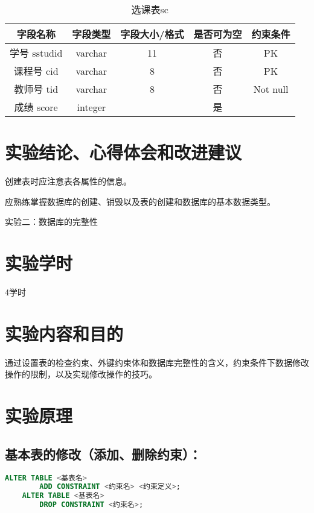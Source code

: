 \documentclass[a4paper]{uestcreport}
\begin{document}
\begin{table}[!h]
    \centering
    \caption{选课表sc}\label{tab:scTable}%
    \begin{tabular}{|c|c|c|c|c|}
        \hline
        字段名称     & 字段类型 & 字段大小/格式 & 是否可为空 & 约束条件 \\
        \hline
        学号 sstudid & varchar  & 11            & 否         & PK       \\
        \hline
        课程号 cid   & varchar  & 8             & 否         & PK       \\
        \hline
        教师号 tid   & varchar  & 8             & 否         & Not null \\
        \hline
        成绩 score   & integer  &               & 是         &          \\
        \hline
    \end{tabular}
\end{table}

\newpage
\section{实验结论、心得体会和改进建议}
创建表时应注意表各属性的信息。

应熟练掌握数据库的创建、销毁以及表的创建和数据库的基本数据类型。

\newpage
\begin{center}
    \Large
    实验二：数据库的完整性
\end{center}

\setcounter{section}{0}
\section{实验学时}
4学时

\section{实验内容和目的}
通过设置表的检查约束、外键约束体和数据库完整性的含义，约束条件下数据修改操作的限制，以及实现修改操作的技巧。

\section{实验原理}
\subsection{基本表的修改（添加、删除约束）：}
\begin{lstlisting}[language=SQL]
    ALTER TABLE <基表名>
        ADD CONSTRAINT <约束名> <约束定义>;
    ALTER TABLE <基表名>
        DROP CONSTRAINT <约束名>;
\end{lstlisting}
\end{document}
